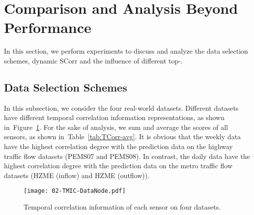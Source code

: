 \documentclass[sn-mathphys,iicol]{sn-jnl}
\newcommand\figref[1]{Figure~\ref{#1}}
\newcommand\tabref[1]{Table~\ref{#1}}
\theoremstyle{thmstyleone}\newtheorem{theorem}{Theorem}\newtheorem{proposition}[theorem]{Proposition}
\theoremstyle{thmstyletwo}\newtheorem{example}{Example}\newtheorem{remark}{Remark}
\theoremstyle{thmstylethree}\newtheorem{definition}{Definition}
\begin{document}
\begin{table}[!h]
    \centering
    \caption{Training and test time cost on four datasets.}
    \label{tab:time}
\end{table}


\section{Comparison and Analysis Beyond Performance}
In this section, we perform experiments to discuss and analyze the data selection schemes, dynamic SCorr and the influence of different top-.




\subsection{Data Selection Schemes}
\label{sec:TCorr}


In this subsection, we consider the four real-world datasets. Different datasets have different temporal correlation information representations, as shown in~\figref{fig:TCorr-datanode}. For the sake of analysis, we sum and average the scores of all sensors, as shown in~\tabref{tab:TCorr-avg}. It is obvious that the weekly data have the highest correlation degree with the prediction data on the highway traffic flow datasets (PEMS07 and PEMS08). In contrast, the daily data have the highest correlation degree with the prediction data on the metro traffic flow datasets (HZME (inflow) and HZME (outflow)).

\begin{figure}[!h]
\centering
\texttt{[image: 02-TMIC-DataNode.pdf]}
\caption{Temporal correlation information of each sensor on four datasets.}
\label{fig:TCorr-datanode}
\end{figure}
\end{document}
